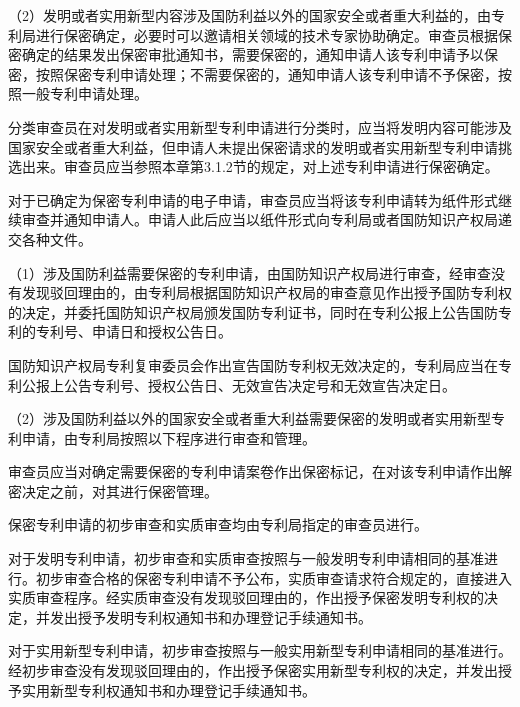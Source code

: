 {\setlength{\parindent}{17.1bp}（2）发明或者实用新型内容涉及国防利益以外的国家安全或者重大利益的，由专利局进行保密确定，必要时可以邀请相关领域的技术专家协助确定。审查员根据保密确定的结果发出保密审批通知书，需要保密的，通知申请人该专利申请予以保密，按照保密专利申请处理；不需要保密的，通知申请人该专利申请不予保密，按照一般专利申请处理。\par}

分类审查员在对发明或者实用新型专利申请进行分类时，应当将发明内容可能涉及国家安全或者重大利益，但申请人未提出保密请求的发明或者实用新型专利申请挑选出来。审查员应当参照本章第3.1.2节的规定，对上述专利申请进行保密确定。

对于已确定为保密专利申请的电子申请，审查员应当将该专利申请转为纸件形式继续审查并通知申请人。申请人此后应当以纸件形式向专利局或者国防知识产权局递交各种文件。

{\setlength{\parindent}{17.1bp}（1）涉及国防利益需要保密的专利申请，由国防知识产权局进行审查，经审查没有发现驳回理由的，由专利局根据国防知识产权局的审查意见作出授予国防专利权的决定，并委托国防知识产权局颁发国防专利证书，同时在专利公报上公告国防专利的专利号、申请日和授权公告日。\par}

国防知识产权局专利复审委员会作出宣告国防专利权无效决定的，专利局应当在专利公报上公告专利号、授权公告日、无效宣告决定号和无效宣告决定日。

{\setlength{\parindent}{17.1bp}（2）涉及国防利益以外的国家安全或者重大利益需要保密的发明或者实用新型专利申请，由专利局按照以下程序进行审查和管理。\par}

审查员应当对确定需要保密的专利申请案卷作出保密标记，在对该专利申请作出解密决定之前，对其进行保密管理。

保密专利申请的初步审查和实质审查均由专利局指定的审查员进行。

对于发明专利申请，初步审查和实质审查按照与一般发明专利申请相同的基准进行。初步审查合格的保密专利申请不予公布，实质审查请求符合规定的，直接进入实质审查程序。经实质审查没有发现驳回理由的，作出授予保密发明专利权的决定，并发出授予发明专利权通知书和办理登记手续通知书。

对于实用新型专利申请，初步审查按照与一般实用新型专利申请相同的基准进行。经初步审查没有发现驳回理由的，作出授予保密实用新型专利权的决定，并发出授予实用新型专利权通知书和办理登记手续通知书。

